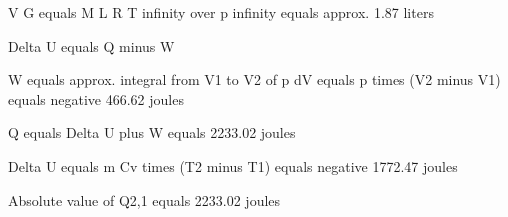 V G equals M L R T infinity over p infinity equals approx. 1.87 liters

Delta U equals Q minus W

W equals approx. integral from V1 to V2 of p dV equals p times (V2 minus V1) equals negative 466.62 joules

Q equals Delta U plus W equals 2233.02 joules

Delta U equals m Cv times (T2 minus T1) equals negative 1772.47 joules

Absolute value of Q2,1 equals 2233.02 joules